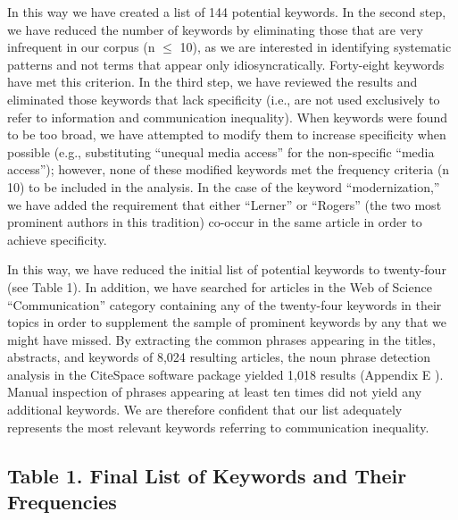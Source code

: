 \documentclass{tufte-handout}
\begin{document}
In this way we have created a list of 144 potential keywords. In the
second step, we have reduced the number of keywords by eliminating those
that are very infrequent in our corpus (n $ \leq $ 10), as we are interested in
identifying systematic patterns and not terms that appear only
idiosyncratically. Forty-eight keywords have met this criterion. In the
third step, we have reviewed the results and eliminated those keywords
that lack specificity (i.e., are not used exclusively to refer to
information and communication inequality). When keywords were found to
be too broad, we have attempted to modify them to increase specificity
when possible (e.g., substituting ``unequal media access'' for the
non-specific ``media access''); however, none of these modified keywords
met the frequency criteria (n  10) to be included in the
analysis. In the case of the keyword ``modernization,'' we have added
the requirement that either ``Lerner'' or ``Rogers'' (the two most
prominent authors in this tradition) co-occur in the same article in
order to achieve specificity.

In this way, we have reduced the initial list of potential keywords to
twenty-four (see Table 1). In addition, we have searched for articles in
the Web of Science ``Communication'' category containing any of the
twenty-four keywords in their topics in order to supplement the sample
of prominent keywords by any that we might have missed. By extracting
the common phrases appearing in the titles, abstracts, and keywords of
8,024 resulting articles, the noun phrase detection analysis in the
CiteSpace software package yielded 1,018 results (Appendix E ). Manual
inspection of phrases appearing at least ten times did not yield any
additional keywords. We are therefore confident that our list adequately
represents the most relevant keywords referring to communication
inequality.

\newpage

\hypertarget{table-1-final-list-of-keywords-and-their-frequencies}{%
\subsection{Table 1. Final List of Keywords and Their
Frequencies}\label{table-1-final-list-of-keywords-and-their-frequencies}}
\end{document}

